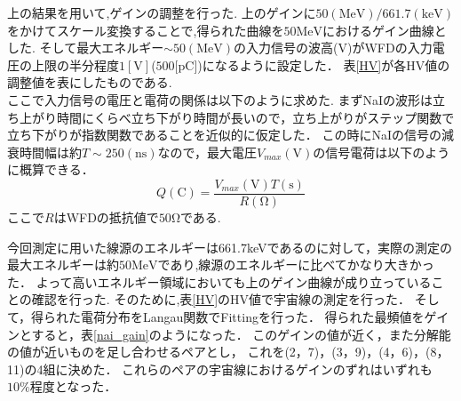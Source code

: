上の結果を用いて,ゲインの調整を行った.
上のゲインに$50(\mathrm{MeV})/661.7(\mathrm{keV})$をかけてスケール変換することで,得られた曲線を$50\mathrm{MeV}$におけるゲイン曲線とした.
そして最大エネルギー$\sim 50(\mathrm{MeV})$の入力信号の波高($\mathrm{V}$)がWFDの入力電圧の上限の半分程度$1[\mathrm{V}]$($500[\mathrm{pC}$])になるように設定した．
表\ref{HV}が各HV値の調整値を表にしたものである.\\
ここで入力信号の電圧と電荷の関係は以下のように求めた.
まずNaIの波形は立ち上がり時間にくらべ立ち下がり時間が長いので，立ち上がりがステップ関数で立ち下がりが指数関数であることを近似的に仮定した．
この時にNaIの信号の減衰時間幅は約$T\sim 250(\mathrm{ns})$なので，最大電圧$V_{max}(\mathrm{V})$の信号電荷は以下のように概算できる．
\begin{equation}
Q(\mathrm{C}) = \frac{V_{max}(\mathrm{V})T(\mathrm{s})}{R(\mathrm{\Omega})}
\end{equation}
ここで$R$はWFDの抵抗値で$50\mathrm{\Omega}$である.

今回測定に用いた線源のエネルギーは661.7keVであるのに対して，実際の測定の最大エネルギーは約$50\mathrm{MeV}$であり,線源のエネルギーに比べてかなり大きかった．
よって高いエネルギー領域においても上のゲイン曲線が成り立っていることの確認を行った.
そのために,表\ref{HV}のHV値で宇宙線の測定を行った．
そして，得られた電荷分布をLangau関数でFittingを行った．
得られた最頻値をゲインとすると，表\ref{nai_gain}のようになった．
このゲインの値が近く，また分解能の値が近いものを足し合わせるペアとし，
これを(2，7)，(3，9)，(4，6)，(8，11)の4組に決めた．
これらのペアの宇宙線におけるゲインのずれはいずれも$10\%$程度となった．

